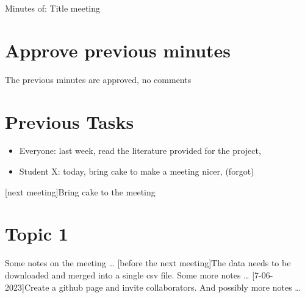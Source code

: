 \documentclass[11pt,a4paper]{article}
\newcommand{\done}{\ding{51}}%
\newcommand{\fail}{\ding{55}}%
\begin{document}
\begin{Minutes}{Minutes of: Title meeting}
\section{Approve previous minutes} %
The previous minutes are approved, no comments

\section{Previous Tasks}%

\begin{itemize}
\item{Everyone: last week, \newline read the literature provided for the project, \done}
\item{Student X: today, \newline bring cake to make a meeting nicer, \fail (forgot)}
\end{itemize}

[next meeting]{Bring cake to the meeting}




\section{Topic 1}%
Some notes on the meeting \dots 
{}[before the next meeting]{The data needs to be downloaded and merged into a single csv file}. Some more notes \dots
{}[7-06-2023]{Create a github page and invite collaborators}. And possibly more notes \dots



\end{Minutes}
\end{document}
